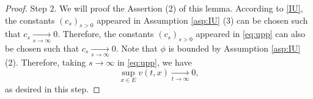 \documentclass[12pt,a4paper]{amsart}
\theoremstyle{plain}
\theoremstyle{definition}
\numberwithin{equation}{section}
\begin{document}
\begin{proof}
	Step 2.
	We will proof the Assertion (2) of this lemma.
	According to \eqref{IU}, 
	the constants $(c_s)_{s>0}$ appeared in Assumption \ref{asp:IU} (3) can be chosen such that $c_s \xrightarrow[s\to \infty]{} 0$.
	Therefore, the constants $(c_s)_{s>0}$ appeared in \eqref{eq:upp} can also be chosen such that $c_s \xrightarrow[s\to \infty]{} 0$.
	Note that $\phi$ is bounded by Assumption \ref{asp:IU} (2).
	Therefore, taking $s\to \infty$ in \eqref{eq:upp}, we have
\begin{equation}
\label{eq: boud of v_t convergence to 0}
	\sup_{x\in E}v(t,x)\xrightarrow[t\to \infty]{} 0,
\end{equation}
	as desired in this step.


\end{proof}
\end{document}
